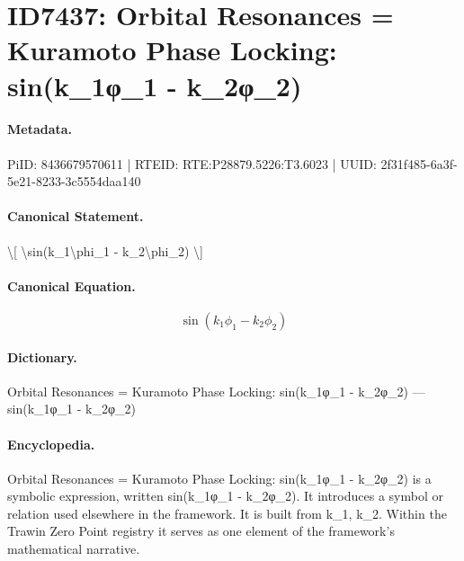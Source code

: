 \section*{ID7437: Orbital Resonances = Kuramoto Phase Locking: sin(k\_1φ\_1 - k\_2φ\_2)}
\paragraph{Metadata.}
PiID: 8436679570611 | RTEID: RTE:P28879.5226:T3.6023 | UUID: 2f31f485-6a3f-5e21-8233-3c5554daa140

\paragraph{Canonical Statement.}
\textbackslash{}[ \textbackslash{}sin(k\_1\textbackslash{}phi\_1 - k\_2\textbackslash{}phi\_2) \textbackslash{}]

\paragraph{Canonical Equation.}
\[
\sin(k_1\phi_1 - k_2\phi_2)
\]

\paragraph{Dictionary.}
Orbital Resonances = Kuramoto Phase Locking: sin(k\_1φ\_1 - k\_2φ\_2) — sin(k\_1φ\_1 - k\_2φ\_2)

\paragraph{Encyclopedia.}
Orbital Resonances = Kuramoto Phase Locking: sin(k\_1φ\_1 - k\_2φ\_2) is a symbolic expression, written sin(k\_1φ\_1 - k\_2φ\_2). It introduces a symbol or relation used elsewhere in the framework. It is built from k\_1, k\_2. Within the Trawin Zero Point registry it serves as one element of the framework's mathematical narrative.
